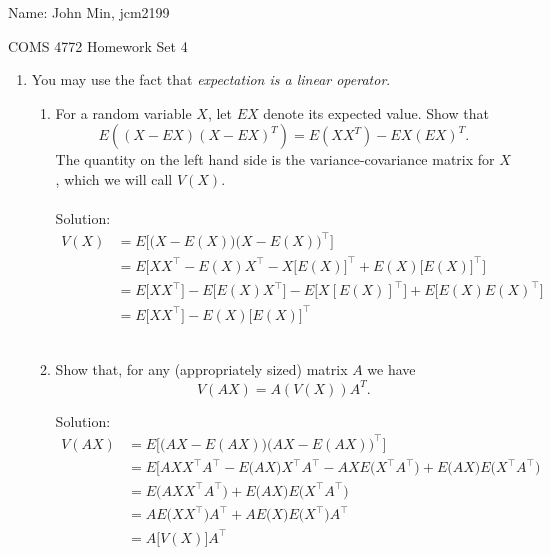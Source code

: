 \documentclass[12pt]{article}
\begin{document}
{\Large Name:}  John Min, jcm2199 \\
\begin{center}
\Large COMS 4772 \hskip 2in Homework Set 4
\end{center}
\bigskip



\noindent

\begin{enumerate}

\item You may use the fact that {\it expectation is a linear operator}.  
\begin{enumerate}
\item For a random variable $X$, let $EX$ denote its expected value. Show that 
\[
E\left((X-EX)(X-EX)^T\right) = E(XX^T) - EX(EX)^T.
\]
The quantity on the left hand side is the variance-covariance matrix for $X$, which we will call $V(X)$.\\ \\

\noindent
Solution: \\
\begin{align*}
V(X) &= E\bigg[ \Big(X - E(X) \Big) \Big(X-E(X) \Big)^\top \bigg] \\
	&= E\bigg[XX^\top - E(X)X^\top - X \big[E(X)\big]^\top + E(X) \big[E(X)\big]^\top \bigg] \\
	&= E \big[ XX^\top \big] - E \big[ E(X) X^\top \big] - E \big[X [E(X)]^\top \big] + E \big [ E(X) E(X)^\top \big ] \\
	&= E \big[X X^\top \big] - E(X) \big[ E(X) \big]^\top
\end{align*} \\


\item Show that, for any (appropriately sized) matrix $A$ we have
\[
V(AX) = A(V(X))A^T.
\]

\noindent
Solution: \\
\begin{align*}
V(AX) &= E\bigg[ \Big(AX - E(AX) \Big) \Big(AX-E(AX) \Big)^\top \bigg] \\
	&= E\bigg[ AXX^\top A^\top - E\Big(AX\Big)X^\top A^\top - AX E\Big(X^\top A^\top \Big) + E\Big(AX \Big) E\Big(X^\top A^\top \Big) \\
	&= E\Big(AXX^\top A^\top \Big) + E\Big(AX \Big) E \Big(X^\top A^\top \Big) \\
	&= A E\Big(XX^\top \Big) A^\top + A E \Big(X \Big) E\Big(X^\top \Big) A^\top \\
	&= A \big[V(X) \big] A^\top
\end{align*} \\



\end{enumerate}
\end{enumerate}
\end{document}
